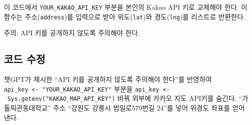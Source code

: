 \documentclass[
  letterpaper,
]{book}
\newenvironment{Shaded}{\begin{snugshade}}{\end{snugshade}}
\newcommand{\AttributeTok}[1]{\textcolor[rgb]{0.40,0.45,0.13}{#1}}
\newcommand{\CommentTok}[1]{\textcolor[rgb]{0.37,0.37,0.37}{#1}}
\newcommand{\ConstantTok}[1]{\textcolor[rgb]{0.56,0.35,0.01}{#1}}
\newcommand{\ControlFlowTok}[1]{\textcolor[rgb]{0.00,0.23,0.31}{#1}}
\newcommand{\DecValTok}[1]{\textcolor[rgb]{0.68,0.00,0.00}{#1}}
\newcommand{\FunctionTok}[1]{\textcolor[rgb]{0.28,0.35,0.67}{#1}}
\newcommand{\NormalTok}[1]{\textcolor[rgb]{0.00,0.23,0.31}{#1}}
\newcommand{\OtherTok}[1]{\textcolor[rgb]{0.00,0.23,0.31}{#1}}
\newcommand{\SpecialCharTok}[1]{\textcolor[rgb]{0.37,0.37,0.37}{#1}}
\newcommand{\StringTok}[1]{\textcolor[rgb]{0.13,0.47,0.30}{#1}}
\begin{document}
\begin{tcolorbox}
\begin{Shaded}
\end{Shaded}

이 코드에서 \texttt{YOUR\_KAKAO\_API\_KEY} 부분을 본인의 Kakao API 키로
교체해야 한다. 이 함수는 주소(\texttt{address})를 입력으로 받아
위도(\texttt{lat})와 경도(\texttt{lng})를 리스트로 반환한다.

주의: API 키를 공개하지 않도록 주의해야 한다.

\end{tcolorbox}

\hypertarget{uxcf54uxb4dc-uxc218uxc815}{%
\subsection{코드 수정}\label{uxcf54uxb4dc-uxc218uxc815}}

챗GPT가 제시한 ``API 키를 공개하지 않도록 주의해야 한다''를 반영하여
\texttt{api\_key\ \textless{}-\ "YOUR\_KAKAO\_API\_KEY"} 부분을
\texttt{api\_key\ \textless{}-\ Sys.getenv("KAKAO\_MAP\_API\_KEY")} 바꿔
외부에 카카오 지도 API키를 숨긴다. ``가톨릭관동대학교'' 주소 ``강원도
강릉시 범일로579번길 24''를 넣어 위경도 좌표를 얻어낸다.
\end{document}
